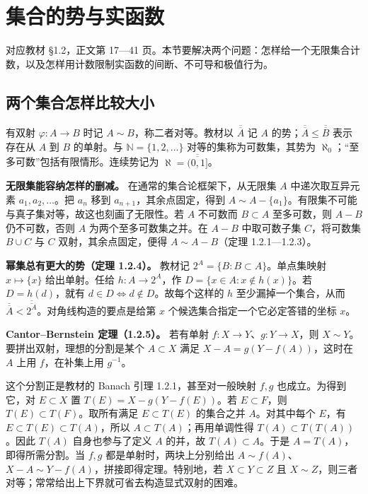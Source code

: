 \documentclass[11pt,a4paper]{article}
\begin{document}
\section{集合的势与实函数}

对应教材 §1.2，正文第 17---41 页。本节要解决两个问题：怎样给一个无限集合计数，以及怎样用计数限制实函数的间断、不可导和极值行为。

\subsection{两个集合怎样比较大小}

有双射 \(\varphi:A\to B\) 时记 \(A\sim B\)，称二者对等。教材以 \(\overline{\overline A}\) 记 \(A\) 的势；\(\overline{\overline A}\le\overline{\overline B}\) 表示存在从 \(A\) 到 \(B\) 的单射。与 \(\mathbb N=\{1,2,\dots\}\) 对等的集称为可数集，其势为 \(\aleph_0\)；``至多可数''包括有限情形。连续势记为 \(\aleph=\overline{\overline{(0,1]}}\)。

\textbf{无限集能容纳怎样的删减。} 在通常的集合论框架下，从无限集 \(A\) 中递次取互异元素 \(a_1,a_2,\ldots\)。把 \(a_n\) 移到 \(a_{n+1}\)，其余点固定，得到 \(A\sim A-\{a_1\}\)。有限集不可能与真子集对等，故这也刻画了无限性。若 \(A\) 不可数而 \(B\subset A\) 至多可数，则 \(A-B\) 仍不可数，否则 \(A\) 为两个至多可数集之并。在 \(A-B\) 中取可数子集 \(C\)，将可数集 \(B\cup C\) 与 \(C\) 双射，其余点固定，便得 \(A\sim A-B\)（定理 1.2.1---1.2.3）。

\textbf{幂集总有更大的势（定理 1.2.4）。} 教材记 \(2^A=\{B:B\subset A\}\)。单点集映射 \(x\mapsto\{x\}\) 给出单射。任给 \(h:A\to 2^A\)，作 \(D=\{x\in A:x\notin h(x)\}\)。若 \(D=h(d)\)，就有 \(d\in D\iff d\notin D\)。故每个这样的 \(h\) 至少漏掉一个集合，从而 \(\overline{\overline A}<\overline{\overline{2^A}}\)。对角线构造的要点是给第 \(x\) 个候选集合指定一个它必定答错的坐标 \(x\)。

\textbf{Cantor--Bernstein 定理（1.2.5）。} 若有单射 \(f:X\to Y\)、\(g:Y\to X\)，则 \(X\sim Y\)。要拼出双射，理想的分割是某个 \(A\subset X\) 满足 \(X-A=g(Y-f(A))\)，这时在 \(A\) 上用 \(f\)，在补集上用 \(g^{-1}\)。

这个分割正是教材的 Banach 引理 1.2.1，甚至对一般映射 \(f,g\) 也成立。为得到它，对 \(E\subset X\) 置 \(T(E)=X-g(Y-f(E))\)。若 \(E\subset F\)，则 \(T(E)\subset T(F)\)。取所有满足 \(E\subset T(E)\) 的集合之并 \(A\)。对其中每个 \(E\)，有 \(E\subset T(E)\subset T(A)\)，所以 \(A\subset T(A)\)；再用单调性得 \(T(A)\subset T(T(A))\)。因此 \(T(A)\) 自身也参与了定义 \(A\) 的并，故 \(T(A)\subset A\)。于是 \(A=T(A)\)，即得所需分割。当 \(f,g\) 都是单射时，两块上分别给出 \(A\sim f(A)\)、\(X-A\sim Y-f(A)\)，拼接即得定理。特别地，若 \(X\subset Y\subset Z\) 且 \(X\sim Z\)，则三者对等；常常给出上下界就可省去构造显式双射的困难。
\end{document}
